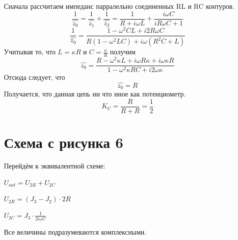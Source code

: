 Сначала рассчитаем импеданс парралельно соединенных RL и RC контуров.
\begin{equation}
	\frac{1}{\hat{z_0}}=\frac{1}{\hat{z_1}}+\frac{1}{\hat{z_2}}=\frac{1}{R+i\omega L}+\frac{i\omega C}{iR\omega C+1}
\end{equation}
\begin{equation}
\frac{1}{\hat{z_0}}=\frac{1-\omega^2 CL+i2R\omega C}{R(1-\omega^2 LC)+i\omega(R^2C+L)}
\end{equation}
Учитывая то, что $L=\kappa R$ и $C=\frac{\kappa}{R}$ получим
\begin{equation}
	\hat{z_0}=\frac{R-\omega^2\kappa L+i\omega R\kappa +i\omega \kappa R}{1-\omega^2\kappa RC+i2\omega\kappa}
\end{equation}
Отсюда следует, что
\begin{equation}
	\hat{z_0}=R
\end{equation}
Получается, что данная цепь ни что иное как потенциометр. 
\begin{equation}
	K_U=\frac{R}{R+R}=\frac{1}{2}
\end{equation}

\section{Схема с рисунка 6}
\begin{center}

\end{center}
Перейдём к эквивалентной схеме:
\begin{center}

\end{center}

$U_{out}=U_{2R}+U_{2C}$


$U_{2R}=(J_3-J_2)\cdot 2R$


$U_{2C}=J_3\cdot\frac{1}{2i\omega C}$  

Все величины подразумеваются комплексными.

